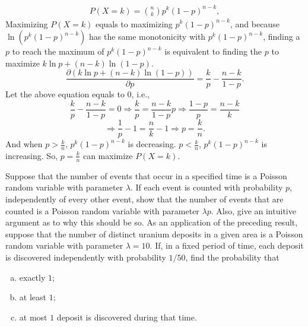 \documentclass[14pt]{elegantbook}
\begin{document}
    \begin{solution}
        \begin{align*}
            P(X=k)=\binom{n}{k}p^k(1-p)^{n-k}, 
        \end{align*}
        Maximizing $P(X=k)$ equals to maximizing $p^k(1-p)^{n-k}$, and because $\ln(p^k(1-p)^{n-k})$ has the same monotonicity with $p^k(1-p)^{n-k}$, 
        finding a $p$ to reach the maximum of $p^k(1-p)^{n-k}$ is equivalent to finding the $p$ to maximize $k\ln p+(n-k)\ln(1-p)$. 
        \[\frac{\partial (k\ln p+(n-k)\ln(1-p))}{\partial p}=\frac{k}{p}-\frac{n-k}{1-p}. \]
        Let the above equation equals to $0$, i.e., 
        \[
            \frac{k}{p}-\frac{n-k}{1-p}=0\Rightarrow \frac{k}{p}=\frac{n-k}{1-p}p\Rightarrow\frac{1-p}{p}=\frac{n-k}{k}
        \]
        \[
            \Rightarrow\frac{1}{p}-1=\frac{n}{k}-1\Rightarrow p=\frac{k}{n}.
        \]
        And when $p>\frac{k}{n}$, $p^k(1-p)^{n-k}$ is decreasing. $p<\frac{k}{n}$, $p^k(1-p)^{n-k}$ is increasing. So, $p=\frac{k}{n}$ can maximize $P(X=k)$. 
    \end{solution}

    \begin{exercise*}[4]
        Suppose that the number of events that occur in a specified time is a Poisson random variable with parameter $\lambda$. If each event is counted with probability $p$, independently of every other event, show that the number of events that are counted is a Poisson random variable with parameter $\lambda p$. Also, give an intuitive argument as to why this should be so. As an application of the preceding result, suppose that the number of distinct uranium deposits in a given area is a Poisson random variable with parameter $\lambda = 10$. If, in a fixed period of time, each deposit is discovered independently with probability  $1/50$, find the probability that 
        \begin{enumerate}[(a)]
            \item exactly $1$; 
            \item at least $1$; 
            \item at most $1$ deposit is discovered during that time.  
        \end{enumerate}
    \end{exercise*}
\end{document}
